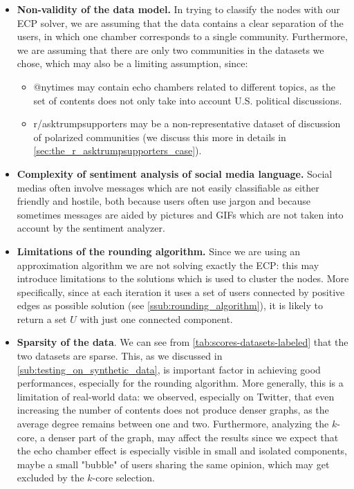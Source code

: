 \begin{itemize}
	\item \textbf{Non-validity of the data model.} In trying to classify the
	      nodes with our \acrshort{ECP} solver, we are assuming that the data
	      contains a clear separation of the users, in which one chamber
	      corresponds to a single community. Furthermore, we are assuming that
	      there are only two communities in the datasets we chose, which may also
	      be a limiting assumption, since:
	      \begin{itemize}
		      \item @nytimes may contain echo chambers related to different
		            topics, as the set of contents does not only take into account
		            U.S. political discussions.
		      \item r/asktrumpsupporters may be a non-representative
		            dataset of discussion of polarized communities (we
		            discuss this more in details in
		            \autoref{sec:the_r_asktrumpsupporters_case}).
	      \end{itemize}
	\item \textbf{Complexity of sentiment analysis of social media language.}
	      Social medias often involve messages which are not easily classifiable
	      as either friendly and hostile, both because users often use jargon
	      and because sometimes messages are aided by pictures and GIFs which
	      are not taken into account by the sentiment analyzer.
	\item \textbf{Limitations of the rounding algorithm.} Since we are
	      using an approximation algorithm we are not solving exactly the
	      \acrshort{ECP}: this may introduce limitations to the solutions which
	      is used to cluster the nodes. More specifically, since at each iteration it uses a set of users
	      connected by positive edges as possible solution (see
	      \autoref{ssub:rounding_algorithm}), it is likely to return
	      a set $U$ with just one connected component.
	\item \textbf{Sparsity of the data}. We can see from
	      \autoref{tab:scores-datasets-labeled} that the two datasets are
	      sparse.
	      This, as we discussed in \autoref{sub:testing_on_synthetic_data}, is
	      important factor in achieving good performances, especially for the
	      rounding algorithm.
	      More generally, this is a limitation of real-world data:
	      we observed, especially on Twitter, that even increasing the number of
	      contents does not produce denser graphs, as the average degree remains
	      between one and two.
	      Furthermore, analyzing the $k$-core, a denser part of the graph, may
	      affect the results since we expect that the echo chamber effect is
	      especially visible in small and isolated components, maybe a small
	      "bubble" of users sharing the same opinion, which may get excluded by
	      the $k$-core selection.

\end{itemize}

